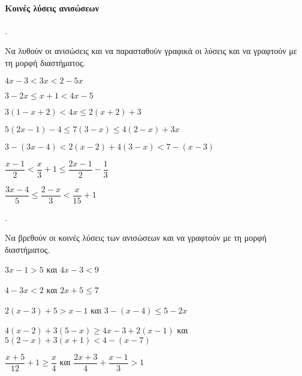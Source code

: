 \documentclass[11pt,a4paper,twocolumn]{article}
\newcounter{askhsh}
\newcommand{\askhsh}{{\large\theaskhsh.}\ \addtocounter{askhsh}{1}}
\begin{document}
\paragraph{Κοινές λύσεις ανισώσεων}
\askhsh Να λυθούν οι ανισώσεις και να παρασταθούν γραφικά οι λύσεις και να γραφτούν με τη μορφή διαστήματος.
\begin{alist}
\item $ 4x-3<3x<2-5x $
\item $ 3-2x\leq x+1<4x-5 $
\item $ 3(1-x+2)<4x\leq2(x+2)+3 $
\item $ 5(2x-1)-4\leq 7(3-x)\leq 4(2-x)+3x $
\item $ 3-(3x-4)<2(x-2)+4(3-x)<7-(x-3) $
\item $ \dfrac{x-1}{2}<\dfrac{x}{3}+1\leq\dfrac{2x-1}{2}-\dfrac{1}{3} $
\item $ \dfrac{3x-4}{5}\leq\dfrac{2-x}{3}<\dfrac{x}{15}+1 $
\end{alist}
\askhsh Να βρεθούν οι κοινές λύσεις των ανισώσεων και να γραφτούν με τη μορφή διαστήματος.
\begin{alist}
\item $ 3x-1>5 $ και $ 4x-3<9 $
\item $ 4-3x<2 $ και $ 2x+5\leq7 $
\item $ 2(x-3)+5>x-1 $ και $ 3-(x-4)\leq5-2x $
\item $ 4(x-2)+3(5-x)\geq4x-3+2(x-1) $ και $ 5(2-x)+3(x+1)<4-(x-7) $
\item $ \dfrac{x+5}{12}+1\geq\dfrac{x}{4} $ και $ \dfrac{2x+3}{4}+\dfrac{x-1}{3}>1 $
\end{alist}
\end{document}
